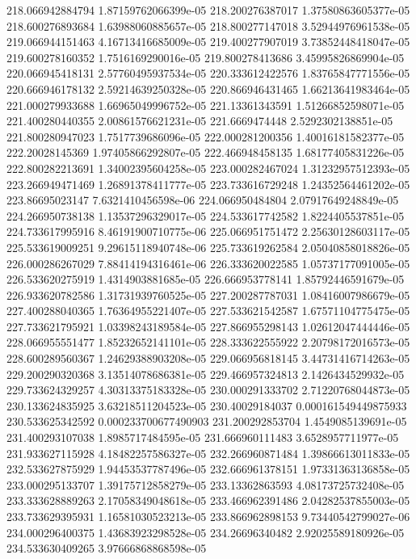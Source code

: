 {218.066942884794 1.87159762066399e-05
218.200276387017 1.37580863605377e-05
218.600276893684 1.63988060885657e-05
218.800277147018 3.52944976961538e-05
219.066944151463 4.16713416685009e-05
219.400277907019 3.73852448418047e-05
219.600278160352 1.7516169290016e-05
219.800278413686 3.45995826869904e-05
220.066945418131 2.57760495937534e-05
220.333612422576 1.83765847771556e-05
220.666946178132 2.59214639250328e-05
220.866946431465 1.66213641983464e-05
221.000279933688 1.66965049996752e-05
221.13361343591 1.51266852598071e-05
221.400280440355 2.00861576621231e-05
221.6669474448 2.5292302138851e-05
221.800280947023 1.7517739686096e-05
222.000281200356 1.40016181582377e-05
222.20028145369 1.97405866292807e-05
222.466948458135 1.68177405831226e-05
222.800282213691 1.34002395604258e-05
223.000282467024 1.31232957512393e-05
223.266949471469 1.26891378411777e-05
223.733616729248 1.24352564461202e-05
223.86695023147 7.6321410456598e-06
224.066950484804 2.07917649248849e-05
224.266950738138 1.13537296329017e-05
224.533617742582 1.8224405537851e-05
224.733617995916 8.46191900710775e-06
225.066951751472 2.25630128603117e-05
225.533619009251 9.29615118940748e-06
225.733619262584 2.05040858018826e-05
226.000286267029 7.88414194316461e-06
226.333620022585 1.05737177091005e-05
226.533620275919 1.4314903881685e-05
226.666953778141 1.85792446591679e-05
226.933620782586 1.31731939760525e-05
227.200287787031 1.08416007986679e-05
227.400288040365 1.76364955221407e-05
227.533621542587 1.67571104775475e-05
227.733621795921 1.03398243189584e-05
227.866955298143 1.02612047444446e-05
228.066955551477 1.85232652141101e-05
228.333622555922 2.20798172016573e-05
228.600289560367 1.24629388903208e-05
229.066956818145 3.44731416714263e-05
229.200290320368 3.13514078686381e-05
229.466957324813 2.1426434529932e-05
229.733624329257 4.30313375183328e-05
230.000291333702 2.71220768044873e-05
230.133624835925 3.63218511204523e-05
230.40029184037 0.000161549449875933
230.533625342592 0.000233700677490903
231.200292853704 1.4549085139691e-05
231.400293107038 1.8985717484595e-05
231.666960111483 3.6528957711977e-05
231.933627115928 4.18482257586327e-05
232.266960871484 1.39866613011833e-05
232.533627875929 1.94453537787496e-05
232.666961378151 1.97331363136858e-05
233.000295133707 1.39175712858279e-05
233.13362863593 4.08173725732408e-05
233.333628889263 2.17058349048618e-05
233.466962391486 2.04282537855003e-05
233.733629395931 1.16581030523213e-05
233.866962898153 9.73440542799027e-06
234.000296400375 1.43683923298528e-05
234.26696340482 2.92025589180926e-05
234.533630409265 3.97666868868598e-05
}
